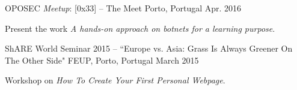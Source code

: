\begin{cventries}
    {OPOSEC \textit{Meetup}: [0x33] -- The Meet}
    {Porto, Portugal}
    {Apr. 2016}
    {
      \begin{cvitems}
        \item {Present the work \textit{A hands-on approach on botnets for a learning purpose}.}
      \end{cvitems}
    }
 
    {ShARE World Seminar 2015 -- \footnotesize{\textnormal{``Europe vs. Asia: Grass Is Always Greener On The Other Side"}}}
    {FEUP, Porto, Portugal}
    {March 2015}
    {
      \begin{cvitems}
        \item {Workshop on \textit{How To Create Your First Personal Webpage}.}
      \end{cvitems}
    }
\end{cventries}
